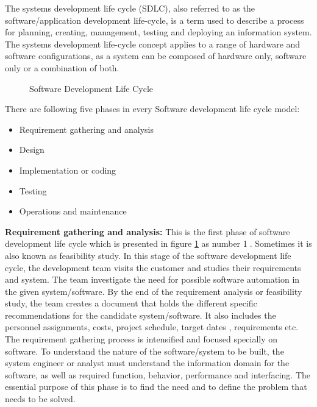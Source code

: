 The systems development life cycle (SDLC), also referred to as the software/application development life-cycle, is a term used to describe a process for planning, creating, management, testing and deploying an information system. The systems development life-cycle concept applies to a range of hardware and software configurations, as a system can be composed of hardware only, software only or a combination of both.

\begin{figure}[htbp]
	\centering
	\caption{Software Development Life Cycle}
	\label{figure_sdlc}
\end{figure}

There are following five phases in every Software development life cycle model:

\begin{itemize}
	\item Requirement gathering and analysis
	\item Design
	\item Implementation or coding
	\item Testing
	\item Operations and maintenance 
\end{itemize}

\textbf{Requirement gathering and analysis:}
This is the first phase of software development life cycle which is presented in figure \ref{figure_sdlc} as number \textcircled{1}. Sometimes it is also known as feasibility study. In this stage of the software development life cycle, the development team visits the customer and studies their requirements and system. The team investigate the need for possible software automation in the given system/software. By the end of the requirement analysis or feasibility study, the team creates a document that holds the different specific recommendations for the candidate system/software. It also includes the personnel assignments, costs, project schedule, target dates , requirements etc. The requirement gathering process is intensified and focused specially on software. To understand the nature of the software/system to be built, the system engineer or analyst must understand the information domain for the software, as well as required function, behavior, performance and interfacing. The essential purpose of this phase is to find the need and to define the problem that needs to be solved.

